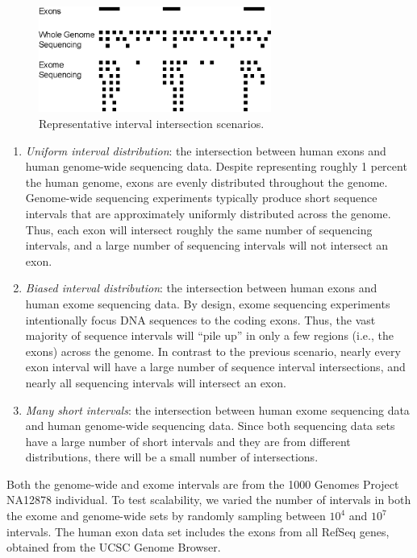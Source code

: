 \documentclass{bioinfo}
\begin{document}
	\begin{figure}[h]
		\begin{center}
			\includegraphics[width=3in]{figures/data_distribution.eps}\end{center}
			\caption{Representative interval intersection scenarios.}
			\label{distro}
		\end{figure}

		\begin{enumerate}
			\item
			{\em Uniform interval distribution}: the intersection between human
			exons and human genome-wide sequencing data.  Despite representing roughly 1
			percent the human genome, exons are evenly distributed throughout the genome.
			Genome-wide sequencing experiments typically produce short sequence intervals
			that are approximately uniformly distributed across the genome. Thus, each exon
			will intersect roughly the same number of sequencing intervals, and a large
			number of sequencing intervals will not intersect an exon.

			\item
			{\em Biased interval distribution}:  the intersection between human
			exons and human exome sequencing data.  By design, exome sequencing experiments
			intentionally focus DNA sequences to the coding exons.  Thus, the vast majority
			of sequence intervals will ``pile up'' in only a few regions (i.e., the exons)
			across the genome. In contrast to the previous scenario, nearly every exon
			interval will have a large number of sequence interval intersections, and nearly
			all sequencing intervals will intersect an exon.

			\item
			{\em Many short intervals}: the intersection between human exome
			sequencing data and human genome-wide sequencing data.  Since both sequencing
			data sets have a large number of short intervals and they are from different
			distributions, there will be a small number of intersections.
		\end{enumerate}

		Both the genome-wide and exome intervals are from the 1000 Genomes Project
		NA12878 individual.  To test scalability, we varied the number of intervals in
		both the exome and genome-wide sets by randomly sampling between $10^4$ and
		$10^7$ intervals.  The human exon data set includes the exons from all RefSeq
		genes, obtained from the UCSC Genome Browser. 
\end{document}

